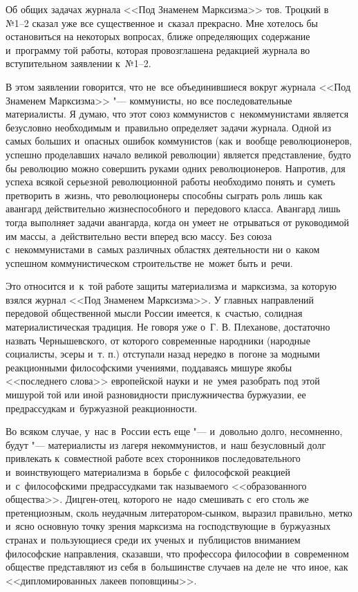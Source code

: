 Об общих задачах журнала <<Под Знаменем Марксизма>> тов. Троцкий в~ №1--2 сказал уже все существенное и~сказал прекрасно. Мне хотелось бы остановиться на некоторых вопросах, ближе определяющих содержание и~программу той работы, которая провозглашена редакцией журнала во вступительном заявлении к~№1--2.

В этом заявлении говорится, что не~все объединившиеся вокруг журнала <<Под Знаменем Марксизма>> "--- коммунисты, но все последовательные материалисты. Я думаю, что этот союз коммунистов с~некоммунистами является безусловно необходимым и~правильно определяет задачи журнала. Одной из самых больших и~опасных ошибок коммунистов (как и~вообще революционеров, успешно проделавших начало великой революции) является представление, будто бы революцию можно совершить руками одних революционеров. Напротив, для успеха всякой серьезной революционной работы необходимо понять и~суметь претворить в~жизнь, что революционеры способны сыграть роль лишь как авангард действительно жизнеспособного и~передового класса. Авангард лишь тогда выполняет задачи авангарда, когда он умеет не~отрываться от руководимой им массы, а~действительно вести вперед всю массу. Без союза с~некоммунистами в~самых различных областях деятельности ни о~каком успешном коммунистическом строительстве не~может быть и~речи.

Это относится и~к~той работе защиты материализма и~марксизма, за которую взялся журнал <<Под Знаменем Марксизма>>. У главных направлений передовой общественной мысли России имеется, к~счастью, солидная материалистическая традиция. Не говоря уже о~Г. В. Плеханове, достаточно назвать Чернышевского, от которого современные народники (народные социалисты, эсеры и~т. п.) отступали назад нередко в~погоне за модными реакционными философскими учениями, поддаваясь мишуре якобы <<последнего слова>> европейской науки и~не~умея разобрать под этой мишурой той или иной разновидности прислужничества буржуазии, ее предрассудкам и~буржуазной реакционности.

Во всяком случае, у~нас в~России есть еще "--- и~довольно долго, несомненно, будут "--- материалисты из лагеря некоммунистов, и~наш безусловный долг привлекать к~совместной работе всех сторонников последовательного и~воинствующего материализма в~борьбе с~философской реакцией и~с~философскими предрассудками так называемого <<образованного общества>>. Дицген-отец, которого не~надо смешивать с~его столь же претенциозным, сколь неудачным литератором-сынком, выразил правильно, метко и~ясно основную точку зрения марксизма на господствующие в~буржуазных странах и~пользующиеся среди их ученых и~публицистов вниманием философские направления, сказавши, что профессора философии в~современном обществе представляют из себя в~большинстве случаев на деле не~что иное, как <<дипломированных лакеев поповщины>>.

